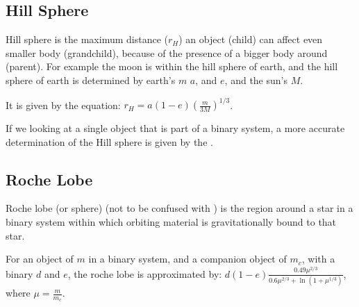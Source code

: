 \documentclass[letterpaper,10pt,english]{sphinxmanual}
\begin{document}
\subsection{Hill Sphere}
\label{\detokenize{quantities/children_orbit_limits/hill_sphere:hill-sphere}}\label{\detokenize{quantities/children_orbit_limits/hill_sphere::doc}}\label{\detokenize{quantities/children_orbit_limits/hill_sphere:id1}}
\sphinxAtStartPar
Hill sphere is the maximum distance (\(r_H\)) an object (child) can affect even smaller body (grandchild),
because of the presence of a bigger body around (parent).
For example the moon is within the hill sphere of earth, and the hill sphere of earth is determined
by earth’s {\hyperref[\detokenize{quantities/material/mass:id1}]{}} \(m\) {\hyperref[\detokenize{quantities/orbital/semi_major_axis:id1}]{}} \(a\),
and {\hyperref[\detokenize{quantities/orbital/eccentricity:id1}]{}} \(e\), and the sun’s {\hyperref[\detokenize{quantities/material/mass:id1}]{}} \(M\).

\sphinxAtStartPar
It is given by the equation: \(r_H = a (1 - e) \left(\frac{m}{3 M}\right)^{1/3}\).

\sphinxAtStartPar
If we looking at a single object that is part of a binary system, a more accurate determination
of the Hill sphere is given by the {\hyperref[\detokenize{quantities/orbital/roche_lobe:id1}]{}}.


\subsection{Roche Lobe}
\label{\detokenize{quantities/children_orbit_limits/roche_lobe:roche-lobe}}\label{\detokenize{quantities/children_orbit_limits/roche_lobe::doc}}\label{\detokenize{quantities/children_orbit_limits/roche_lobe:id1}}
\sphinxAtStartPar
Roche lobe (or sphere) (not to be confused with {\hyperref[\detokenize{quantities/children_orbit_limits/roche_limit:id1}]{}}) is the region
around a star in a binary system within which orbiting material is gravitationally bound to that star.

\sphinxAtStartPar
For an object of {\hyperref[\detokenize{quantities/material/mass:id1}]{}} \(m\) in a binary system, and a companion object of
{\hyperref[\detokenize{quantities/material/mass:id1}]{}} \(m_c\), with a binary  {\hyperref[\detokenize{quantities/orbital/semi_major_axis:id1}]{}} \(d\)
and {\hyperref[\detokenize{quantities/orbital/eccentricity:id1}]{}} \(e\), the roche lobe is approximated by:
\(d (1 - e) \frac{0.49 \mu^{2/3}}{0.6\mu^{2/3} + \ln{\left(1 + \mu^{1/3}\right)}}\), where
\(\mu = \frac{m}{m_c}\).
\end{document}
